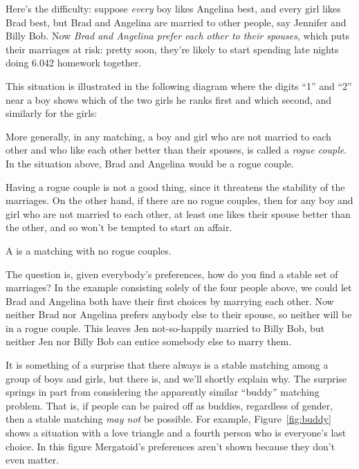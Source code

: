 Here's the difficulty: suppose \emph{every} boy likes Angelina best, and
every girl likes Brad best, but Brad and Angelina are married to other
people, say Jennifer and Billy Bob.  Now \emph{Brad and Angelina prefer
each other to their spouses}, which puts their marriages at risk: pretty
soon, they're likely to start spending late nights doing 6.042 homework
together.

This situation is illustrated in the following diagram where the digits
``1'' and ``2'' near a boy shows which of the two girls he ranks first and
which second, and similarly for the girls:


More generally, in any matching, a boy and girl who are not married to
each other and who like each other better than their spouses, is called a
{\em rogue couple}.  In the situation above, Brad and Angelina would be a
rogue couple.

Having a rogue couple is not a good thing, since it threatens the
stability of the marriages.  On the other hand, if there are no rogue
couples, then for any boy and girl who are not married to each other, at
least one likes their spouse better than the other, and so won't be
tempted to start an affair.

\begin{definition}
  A  is a matching with no rogue couples.
\end{definition}
 
The question is, given everybody's preferences, how do you find a stable
set of marriages?  In the example consisting solely of the four people
above, we could let Brad and Angelina both have their first choices by
marrying each other.  Now neither Brad nor Angelina prefers anybody else
to their spouse, so neither will be in a rogue couple.  This leaves Jen
not-so-happily married to Billy Bob, but neither Jen nor Billy Bob can
entice somebody else to marry them.
 
It is something of a surprise that there always is a stable matching among
a group of boys and girls, but there is, and we'll shortly explain why.
The surprise springs in part from considering the apparently similar
``buddy'' matching problem.  That is, if people can be paired off as
buddies, regardless of gender, then a stable matching \emph{may not} be
possible.  For example, Figure~\ref{fig:buddy} shows a situation with a
love triangle and a fourth person who is everyone's last choice.  In this
figure Mergatoid's preferences aren't shown because they don't even
matter.   

